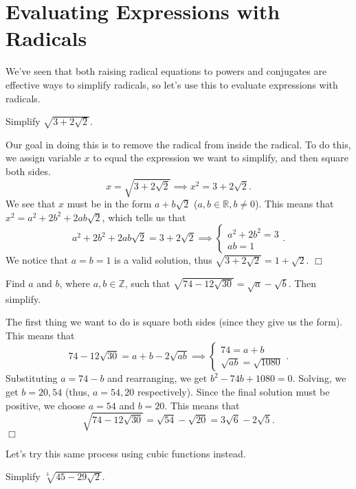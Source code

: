 \documentclass[../book.tex]{subfiles}
\begin{document}
\section{Evaluating Expressions with Radicals}
\noindent We've seen that both raising radical equations to powers and conjugates are effective ways to simplify radicals, so let's use this to evaluate expressions with radicals.
\begin{example}
Simplify $\sqrt{3+2\sqrt{2}}$.
\end{example}
\begin{solution}
Our goal in doing this is to remove the radical from inside the radical.  To do this, we assign variable $x$ to equal the expression we want to simplify, and then square both sides.  $$x=\sqrt{3+2\sqrt{2}} \implies x^2=3+2\sqrt{2}.$$  We see that $x$ must be in the form $a+b\sqrt{2}$ ($a,b\in\mathbb{R},b\neq 0$).  This means that $x^2=a^2+2b^2+2ab\sqrt{2}$, which tells us that $$a^2+2b^2+2ab\sqrt{2}=3+2\sqrt{2} \implies\begin{cases} a^2+2b^2=3 \\ ab=1\end{cases}.$$  We notice that $a=b=1$ is a valid solution, thus $\sqrt{3+2\sqrt{2}}=1+\sqrt{2}$. $\Box$
\end{solution}
\begin{example}
Find $a$ and $b$, where $a,b\in\mathbb{Z}$, such that $\sqrt{74-12\sqrt{30}}=\sqrt{a}-\sqrt{b}$. Then simplify.
\end{example}
\begin{solution}
The first thing we want to do is square both sides (since they give us the form).  This means that $$74-12\sqrt{30}=a+b-2\sqrt{ab} \implies \begin{cases} 74=a+b \\ \sqrt{ab}=\sqrt{1080}\end{cases}.$$ Substituting $a=74-b$ and rearranging, we get $b^2-74b+1080=0$.  Solving, we get $b=20,54$ (thus, $a=54,20$ respectively).  Since the final solution must be positive, we choose $a=54$ and $b=20$.  This means that $$\sqrt{74-12\sqrt{30}}=\sqrt{54}-\sqrt{20}=3\sqrt{6}-2\sqrt{5}.$$ $\Box$
\end{solution}
Let's try this same process using cubic functions instead.
\begin{example}
Simplify $\sqrt[3]{45-29\sqrt{2}}$.
\end{example}
\end{document}
